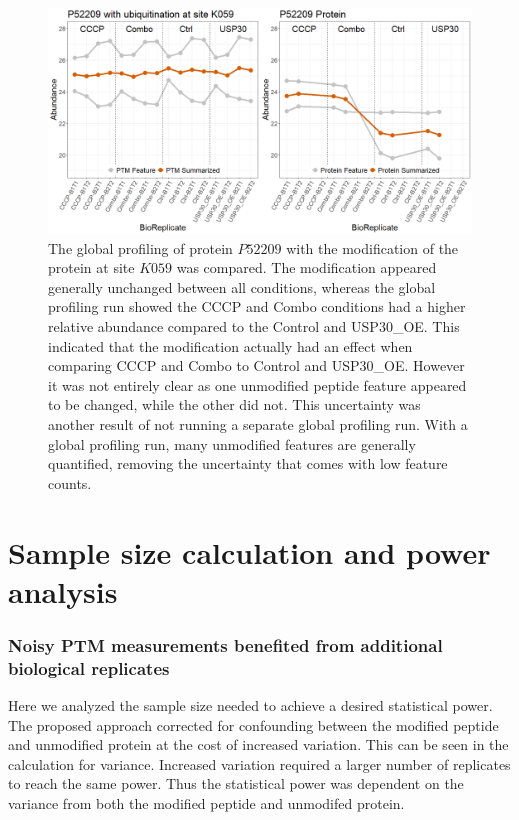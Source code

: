 \documentclass{mcp}
\begin{document}
\begin{figure}[h!]
\centering
\includegraphics[width=\textwidth]{sim_new/USP30_profile_plot}
\caption{The global profiling of protein $P52209$ with the modification of the protein at site $K059$ was compared. The modification appeared generally unchanged between all conditions, whereas the global profiling run showed the CCCP and Combo conditions had a higher relative abundance compared to the Control and USP30\_OE. This indicated that the modification actually had an effect when comparing CCCP and Combo to Control and USP30\_OE. However it was not entirely clear as one unmodified peptide feature appeared to be changed, while the other did not. This uncertainty was another result of not running a separate global profiling run. With a global profiling run, many unmodified features are generally quantified, removing the uncertainty that comes with low feature counts.}
\label{fig:USP30_profile_plot}
\end{figure}
\clearpage
\section{Sample size calculation and power analysis}

\subsubsection*{Noisy PTM measurements benefited from additional biological replicates}

Here we analyzed the sample size needed to achieve a desired statistical power. The proposed approach corrected for confounding between the modified peptide and unmodified protein at the cost of increased variation. This can be seen in the calculation for variance. Increased variation required a larger number of replicates to reach the same power. Thus the statistical power was dependent on the variance from both the modified peptide and unmodifed protein.
\end{document}

